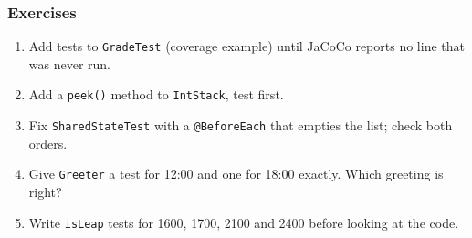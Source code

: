 \documentclass[aspectratio=169,10pt,compress]{beamer}
\begin{document}
\begin{frame}[t,fragile] \frametitle{Exercises}
  \begin{enumerate}\small
    \item Add tests to \texttt{GradeTest} (coverage example) until JaCoCo reports no line that was never run.
    \item Add a \texttt{peek()} method to \texttt{IntStack}, test first.
    \item Fix \texttt{SharedStateTest} with a \texttt{@BeforeEach} that empties the list; check both orders.
    \item Give \texttt{Greeter} a test for 12:00 and one for 18:00 exactly. Which greeting is right?
    \item Write \texttt{isLeap} tests for 1600, 1700, 2100 and 2400 before looking at the code.
  \end{enumerate}
\end{frame}




\begin{frame}[t,fragile]
	\begin{center}
		\vspace{4cm}
	\end{center}
\end{frame}
\end{document}
